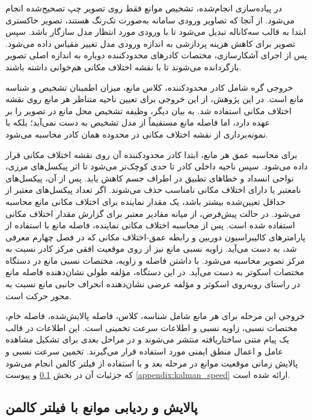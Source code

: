 در پیاده‌سازی انجام‌شده، تشخیص موانع فقط روی تصویر چپ تصحیح‌شده انجام می‌شود. از آنجا که تصاویر ورودی سامانه به‌صورت تک‌رنگ هستند، تصویر خاکستری ابتدا به قالب سه‌کاناله تبدیل می‌شود تا با ورودی مورد انتظار مدل  سازگار باشد. سپس تصویر برای کاهش هزینه پردازشی به اندازه ورودی مدل تغییر مقیاس داده می‌شود. پس از اجرای آشکارسازی، مختصات کادرهای محدودکننده دوباره به اندازه اصلی تصویر بازگردانده می‌شوند تا با نقشه اختلاف مکانی هم‌خوانی داشته باشند.

خروجی گره  شامل کادر محدودکننده، کلاس مانع، میزان اطمینان تشخیص و شناسه مانع است. در این پژوهش، از این خروجی برای تعیین ناحیه متناظر هر مانع روی نقشه اختلاف مکانی استفاده شد. به بیان دیگر،  وظیفه تشخیص محل مانع در تصویر را بر عهده دارد، اما فاصله مانع مستقیماً از مدل تشخیص به دست نمی‌آید؛ بلکه با نمونه‌برداری از نقشه اختلاف مکانی در محدوده همان کادر محاسبه می‌شود.

برای محاسبه عمق هر مانع، ابتدا کادر محدودکننده آن روی نقشه اختلاف مکانی قرار داده می‌شود. سپس ناحیه داخلی کادر تا حدی کوچک‌تر می‌شود تا اثر پیکسل‌های مرزی، نواحی انسداد و خطاهای تطبیق در اطراف جسم کاهش یابد. پس از آن، پیکسل‌های نامعتبر یا دارای اختلاف مکانی نامناسب حذف می‌شوند. اگر تعداد پیکسل‌های معتبر از حداقل تعیین‌شده بیشتر باشد، یک مقدار نماینده برای اختلاف مکانی مانع محاسبه می‌شود. در حالت پیش‌فرض، از میانه مقادیر معتبر برای گزارش مقدار اختلاف مکانی استفاده شده است.
پس از محاسبه اختلاف مکانی نماینده، فاصله مانع با استفاده از پارامترهای کالیبراسیون دوربین و رابطه عمق-اختلاف مکانی که در فصل چهارم معرفی شد، به دست می‌آید. زاویه نسبی مانع نیز از روی موقعیت افقی مرکز کادر نسبت به مرکز تصویر محاسبه می‌شود. با داشتن فاصله و زاویه، مختصات نسبی مانع در دستگاه مختصات اسکوتر به دست می‌آید. در این دستگاه، مؤلفه طولی نشان‌دهنده فاصله مانع در راستای روبه‌روی اسکوتر و مؤلفه عرضی نشان‌دهنده انحراف جانبی مانع نسبت به محور حرکت است.

خروجی این مرحله برای هر مانع شامل شناسه، کلاس، فاصله پالایش‌شده، فاصله خام، مختصات نسبی، زاویه نسبی و اطلاعات سرعت تخمینی است. این اطلاعات در قالب یک پیام متنی ساختاریافته منتشر می‌شوند و در مراحل بعدی برای تشکیل مشاهده عامل و اعمال منطق ایمنی مورد استفاده قرار می‌گیرند. تخمین سرعت نسبی و پالایش زمانی موقعیت موانع در مرحله بعد و با استفاده از فیلتر کالمن انجام می‌شود که جزئیات آن در بخش \ref{subsec:real_obstacle_kalman_filtering} و پیوست \ref{appendix:kalman_speed} ارائه شده است.

\subsection{پالایش و ردیابی موانع با فیلتر کالمن}
\label{subsec:real_obstacle_kalman_filtering}

